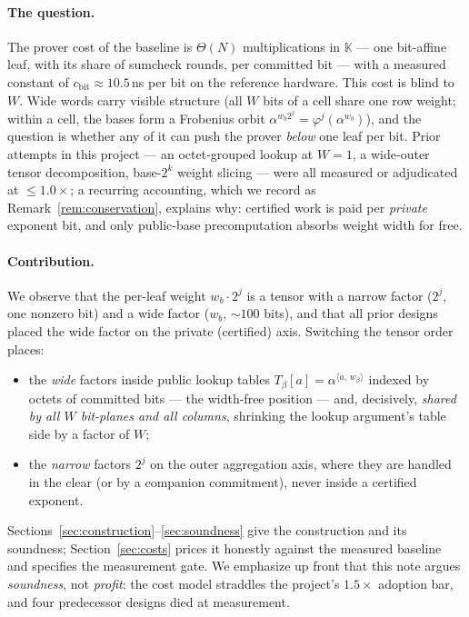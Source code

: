 \documentclass[11pt]{article}
\theoremstyle{definition}
\newcommand{\K}{\mathbb{K}}
\newcommand{\ip}[2]{\langle #1,\, #2\rangle}
\begin{document}
\paragraph{The question.}
The prover cost of the baseline is $\Theta(N)$ multiplications in $\K$
--- one bit-affine leaf, with its share of sumcheck rounds, per committed
bit --- with a measured constant of $c_{\mathrm{bit}}\approx 10.5$\,ns per
bit on the reference hardware. This cost is blind to $W$. Wide words carry
visible structure (all $W$ bits of a cell share one row weight; within a
cell, the bases form a Frobenius orbit $\alpha^{w_b2^j}=\varphi^j(\alpha^{w_b})$),
and the question is whether any of it can push the prover \emph{below}
one leaf per bit. Prior attempts in this project --- an octet-grouped
lookup at $W=1$, a wide-outer tensor decomposition, base-$2^k$
weight slicing --- were all measured or adjudicated at
$\le 1.0\times$; a recurring accounting, which we record as
Remark~\ref{rem:conservation}, explains why: certified work is paid per
\emph{private} exponent bit, and only public-base precomputation absorbs
weight width for free.

\paragraph{Contribution.}
We observe that the per-leaf weight $w_b\cdot 2^j$ is a tensor with a
narrow factor ($2^j$, one nonzero bit) and a wide factor
($w_b$, $\sim\!100$ bits), and that all prior designs placed the wide
factor on the private (certified) axis. Switching the tensor order places:
\begin{itemize}
\item the \emph{wide} factors inside public lookup tables
  $T_\beta[a]=\alpha^{\ip{a}{w_\beta}}$ indexed by octets of committed
  bits --- the width-free position --- and, decisively, \emph{shared by
  all $W$ bit-planes and all columns}, shrinking the lookup argument's
  table side by a factor of $W$;
\item the \emph{narrow} factors $2^j$ on the outer aggregation axis, where
  they are handled in the clear (or by a companion commitment), never
  inside a certified exponent.
\end{itemize}
Sections~\ref{sec:construction}--\ref{sec:soundness} give the construction
and its soundness; Section~\ref{sec:costs} prices it honestly against the
measured baseline and specifies the measurement gate. We emphasize
up front that this note argues \emph{soundness}, not \emph{profit}: the
cost model straddles the project's $1.5\times$ adoption bar, and four
predecessor designs died at measurement.
\end{document}
